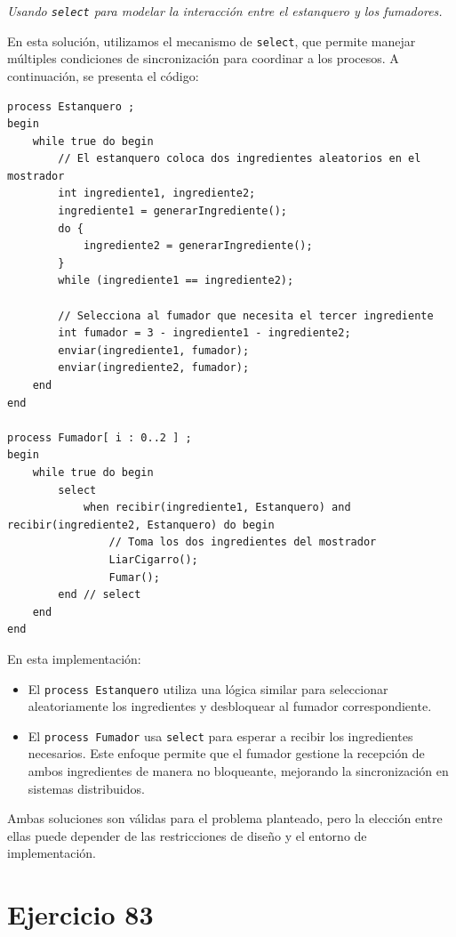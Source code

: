 \documentclass[a4paper,12pt]{article}
\begin{document}
\textit{Usando \texttt{select} para modelar la interacción entre el estanquero y los fumadores.}

En esta solución, utilizamos el mecanismo de \texttt{select}, que permite manejar múltiples condiciones de sincronización para coordinar a los procesos. A continuación, se presenta el código:

\begin{lstlisting}[style=customcpp]
process Estanquero ;
begin
    while true do begin
        // El estanquero coloca dos ingredientes aleatorios en el mostrador
        int ingrediente1, ingrediente2;
        ingrediente1 = generarIngrediente();
        do {
            ingrediente2 = generarIngrediente();
        }
        while (ingrediente1 == ingrediente2);
        
        // Selecciona al fumador que necesita el tercer ingrediente
        int fumador = 3 - ingrediente1 - ingrediente2;
        enviar(ingrediente1, fumador);
        enviar(ingrediente2, fumador);
    end
end

process Fumador[ i : 0..2 ] ;
begin
    while true do begin
        select 
            when recibir(ingrediente1, Estanquero) and  recibir(ingrediente2, Estanquero) do begin
                // Toma los dos ingredientes del mostrador
                LiarCigarro();
                Fumar();
        end // select
    end
end
\end{lstlisting}

En esta implementación:
\begin{itemize}
    \item El \texttt{process Estanquero} utiliza una lógica similar para seleccionar aleatoriamente los ingredientes y desbloquear al fumador correspondiente.
    \item El \texttt{process Fumador} usa \texttt{select} para esperar a recibir los ingredientes necesarios. Este enfoque permite que el fumador gestione la recepción de ambos ingredientes de manera no bloqueante, mejorando la sincronización en sistemas distribuidos.
\end{itemize}

Ambas soluciones son válidas para el problema planteado, pero la elección entre ellas puede depender de las restricciones de diseño y el entorno de implementación.


\section{Ejercicio 83}
\end{document}
